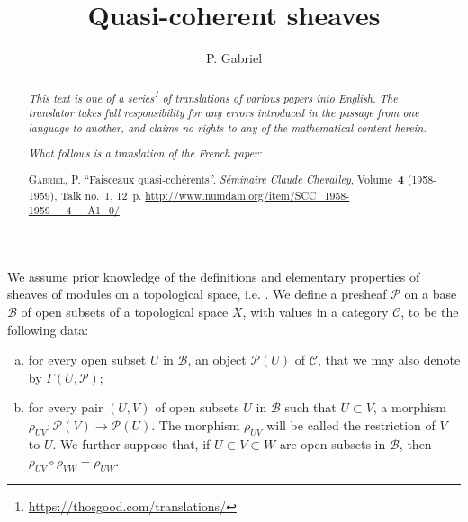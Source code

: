 \documentclass{article}
\title{Quasi-coherent sheaves}
\author{P. Gabriel}
\date{}
\theoremstyle{plain}
\theoremstyle{definition}
\newcommand{\sh}{\mathscr}
\newcommand{\cat}{\mathcal}
\newcommand{\oldpage}[1]{\marginpar{\footnotesize$\Big\vert$ \textit{p.~#1}}}
\begin{document}
\maketitle
\thispagestyle{fancy}

\renewcommand{\abstractname}{Translator's note.}

\begin{abstract}
  \renewcommand*{\thefootnote}{\fnsymbol{footnote}}
  \emph{This text is one of a series\footnote{\url{https://thosgood.com/translations/}} of translations of various papers into English.}
  \emph{The translator takes full responsibility for any errors introduced in the passage from one language to another, and claims no rights to any of the mathematical content herein.}

  \medskip
  
  \emph{What follows is a translation of the French paper:}

  \medskip\noindent
  \textsc{Gabriel, P.}
  ``Faisceaux quasi-coh\'{e}rents''.
  \emph{S\'{e}minaire Claude Chevalley}, Volume~\textbf{4} (1958-1959), Talk no.~1, 12~p.
  {\footnotesize\url{http://www.numdam.org/item/SCC_1958-1959__4__A1_0/}}
\end{abstract}

\setcounter{footnote}{0}

\tableofcontents
\bigskip



\oldpage{1-01}
We assume prior knowledge of the definitions and elementary properties of sheaves of modules on a topological space, i.e. \cite[chapitre~I, \S1; chapitre~II, \S\S1--2]{2}.
We define a presheaf $\sh{P}$ on a base $\mathscr{B}$ of open subsets of a topological space $X$, with values in a category $\cat{C}$, to be the following data:
\begin{enumerate}[(a)]
  \item for every open subset $U$ in $\mathscr{B}$, an object $\sh{P}(U)$ of $\cat{C}$, that we may also denote by $\Gamma(U,\sh{P})$;
  \item for every pair $(U,V)$ of open subsets $U$ in $\mathscr{B}$ such that $U\subset V$, a morphism $\rho_{UV}\colon\sh{P}(V)\to\sh{P}(U)$.
    The morphism $\rho_{UV}$ will be called the restriction of $V$ to $U$.
    We further suppose that, if $U\subset V\subset W$ are open subsets in $\mathscr{B}$, then $\rho_{UV}\circ\rho_{VW}=\rho_{UW}$.
\end{enumerate}
\end{document}

